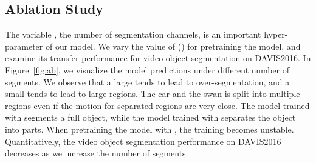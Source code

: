 \subsection{Ablation Study}
\label{sec:ablation}

The variable , the number of segmentation channels, is an important hyper-parameter of our model. 
We vary the value of  () for pretraining the model, and examine its transfer performance for video object segmentation on DAVIS2016.
In Figure~\ref{fig:ab}, we visualize the model predictions under different number of segments. We observe that a large  tends to lead to over-segmentation, and a small  tends to lead to large regions.
The car and the swan is split into multiple regions even if the motion for separated regions are very close.
The model trained with  segments a full object, while the model trained with  separates the object into parts.
When pretraining the model with , the training becomes unstable.
Quantitatively, the video object segmentation performance on DAVIS2016 decreases as we increase the number of segments.




\begin{table}[t]
	
	
\end{table}
